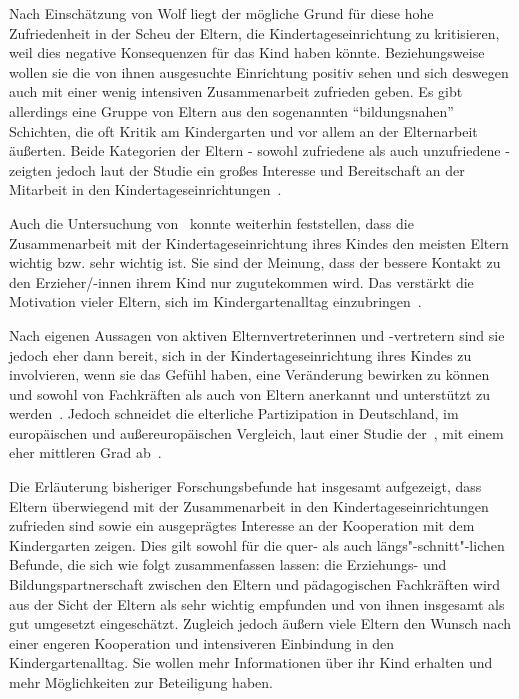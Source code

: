 \documentclass[12pt,a4paper]{article}
\begin{document}
	Nach Einschätzung von Wolf liegt der mögliche Grund für diese hohe Zufriedenheit in der Scheu der Eltern, die Kindertageseinrichtung zu kritisieren, weil dies negative Konsequenzen für das Kind haben könnte. Beziehungsweise wollen sie die von ihnen ausgesuchte Einrichtung positiv sehen und sich deswegen auch mit einer wenig intensiven Zusammenarbeit zufrieden geben. Es gibt allerdings eine Gruppe von Eltern aus den sogenannten "`bildungsnahen"' Schichten, die oft Kritik am Kindergarten und vor allem an der Elternarbeit äußerten. Beide Kategorien der Eltern - sowohl zufriedene als auch unzufriedene - zeigten jedoch laut der Studie ein großes Interesse und Bereitschaft an der Mitarbeit in den Kindertageseinrichtungen~\parencite[S.~32-34]{Wolf_2002}.
	
Auch die Untersuchung von~\textcite{Jeske} konnte weiterhin feststellen, dass die Zusammenarbeit mit der Kindertageseinrichtung ihres Kindes den meisten Eltern wichtig bzw. sehr wichtig ist. Sie sind der Meinung, dass der bessere Kontakt zu den Erzieher/-innen ihrem Kind nur zugutekommen wird. Das verstärkt die Motivation vieler Eltern, sich im Kindergartenalltag einzubringen~\parencite[S.~63]{Jeske}.

Nach eigenen Aussagen von aktiven Elternvertreterinnen und -vertretern sind sie jedoch eher dann bereit, sich in der Kindertageseinrichtung ihres Kindes zu involvieren, wenn sie das Gefühl haben, eine Veränderung bewirken zu können und sowohl von Fachkräften als auch von Eltern anerkannt und unterstützt zu werden~\parencite[S.~43]{Hense}. Jedoch schneidet die elterliche Partizipation in Deutschland, im europäischen und außereuropäischen Vergleich, laut einer Studie der~\textcite{OECD}, mit einem eher mittleren Grad ab~\parencite[S.~15]{WIFF}.

	 Die Erläuterung bisheriger Forschungsbefunde hat insgesamt aufgezeigt, dass Eltern überwiegend mit der Zusammenarbeit in den Kindertageseinrichtungen zufrieden sind sowie ein ausgeprägtes Interesse an der Kooperation mit dem Kindergarten zeigen. Dies gilt sowohl für die quer- als auch längs"-schnitt"-lichen Befunde, die sich wie folgt zusammenfassen lassen: die Erziehungs- und Bildungspartnerschaft zwischen den Eltern und pädagogischen Fachkräften wird aus der Sicht der Eltern als sehr wichtig empfunden und von ihnen insgesamt als gut umgesetzt eingeschätzt. Zugleich jedoch äußern viele Eltern den Wunsch nach einer engeren Kooperation und intensiveren Einbindung in den Kindergartenalltag. Sie wollen mehr Informationen über ihr Kind erhalten und mehr Möglichkeiten zur Beteiligung haben.	
	 
\end{document}
